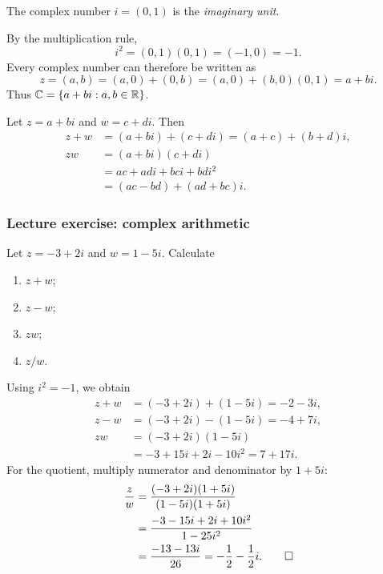 \documentclass[11pt,a4paper]{amsart}
\begin{document}
\begin{definition}
  The complex number \(i=(0,1)\) is the \emph{imaginary unit}.
\end{definition}

By the multiplication rule,
\[
  i^2=(0,1)(0,1)=(-1,0)=-1.
\]
Every complex number can therefore be written as
\[
  z=(a,b)=(a,0)+(0,b)=(a,0)+(b,0)(0,1)=a+bi.
\]
Thus \(\mathbb{C}=\left\lbrace a+bi:a,b\in\mathbb{R}\right\rbrace\).

\begin{example}
  Let \(z=a+bi\) and \(w=c+di\). Then
  \begin{align*}
    z+w&=(a+bi)+(c+di)=(a+c)+(b+d)i,\\
    zw&=(a+bi)(c+di)\\
    &=ac+adi+bci+bdi^2\\
    &=(ac-bd)+(ad+bc)i.
  \end{align*}
\end{example}

\subsubsection{Lecture exercise: complex arithmetic}

\begin{problem}
  Let \(z=-3+2i\) and \(w=1-5i\). Calculate
  \begin{enumerate}[label=(\alph*)]
    \item \(z+w\);
    \item \(z-w\);
    \item \(zw\);
    \item \(z/w\).
  \end{enumerate}
\end{problem}

\begin{solution}
  Using \(i^2=-1\), we obtain
  \begin{align*}
    z+w&=(-3+2i)+(1-5i)=-2-3i,\\
    z-w&=(-3+2i)-(1-5i)=-4+7i,\\
    zw&=(-3+2i)(1-5i)\\
    &=-3+15i+2i-10i^2=7+17i.
  \end{align*}
  For the quotient, multiply numerator and denominator by \(1+5i\):
  \begin{align*}
    \frac{z}{w}
    &=\frac{(-3+2i)(1+5i)}{(1-5i)(1+5i)}\\
    &=\frac{-3-15i+2i+10i^2}{1-25i^2}\\
    &=\frac{-13-13i}{26}
    =-\frac12-\frac12i.\qedhere
  \end{align*}
\end{solution}
\end{document}
